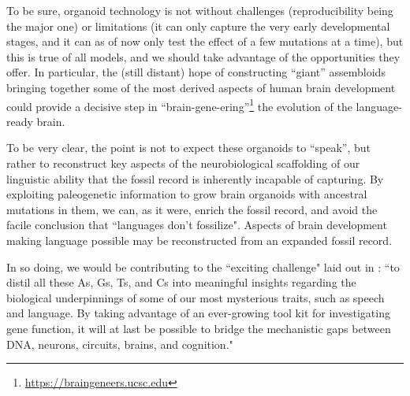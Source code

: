 To be sure, organoid technology is not without challenges (reproducibility being the major one) or limitations (it can only capture the very early developmental stages, and it can as of now only test the effect of a few mutations at a time), but this is true of all models, and we should take advantage of the opportunities they offer. In particular, the (still distant) hope of constructing ``giant'' assembloids bringing together some of the most derived aspects of human brain development could provide a decisive step in ``brain-gene-ering''\footnote{\url{https://braingeneers.ucsc.edu}} the evolution of the language-ready brain.

To be very clear, the point is not to expect these organoids to ``speak'', but rather to reconstruct key aspects of the neurobiological scaffolding of our linguistic ability that the fossil record is inherently incapable of capturing. By exploiting paleogenetic information to grow brain organoids with ancestral mutations in them, we can, as it were, enrich the fossil record, and avoid the facile conclusion that ``languages don't fossilize". Aspects of brain development making language possible may be reconstructed from an expanded fossil record.

In so doing, we would be contributing to the ``exciting challenge" laid out in \cite{fisher2015translating}: ``to distil all these As, Gs, Ts, and Cs into meaningful insights regarding the biological underpinnings of some of our most mysterious traits, such as speech and language. By taking advantage of an ever-growing tool kit for investigating gene function, it will at last be possible to bridge the mechanistic gaps between DNA, neurons, circuits, brains, and cognition."
